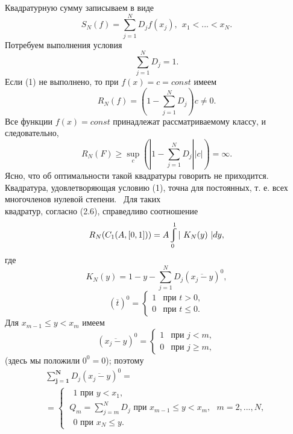 \documentclass[a5paper,12pt]{book}
\begin{document}
	Квадратурную сумму записываем в виде
	\vspace{-2mm}
	\footnotesize $$S_N(f)=\sum\limits_{j=1}^{N} D_jf(x_j),\ \ x_1<...<x_N.$$ \normalsize
	\vskip -2mm
	\noindent Потребуем выполнения условия
	\vspace{-2mm}
	\footnotesize
	\begin{equation}
		\sum_{j=1}^{N}D_j=1.
	\end{equation}
	\normalsize
	\vskip -3mm
	\noindent Если (1) не выполнено, то при $f(x)=c=const$ имеем
	\vspace{0mm}
	\footnotesize $$R_N(f)=\left(1-\sum\limits_{j=1}^{N}D_j\right)c\neq 0.$$ \normalsize
	\vskip 0mm
	\noindent Все функции $f(x)=const$ принадлежат рассматриваемому классу, и следовательно,
	\vspace{-2mm}
	\footnotesize $$R_N(F)\geqslant\sup_c\left(\left|1-\sum\limits_{j=1}^{N}D_j\right|\left|c\right|\right)=\infty.$$ \normalsize
	Ясно, что об оптимальности такой квадратуры говорить не при\-ходится.
	Квадратура, удовлетворяющая условию (1), точна для постоянных, т. е. всех
	многочленов нулевой степени. \ Для таких \\ квадратур, согласно (2.6), справедливо соотношение
	\footnotesize$$R_N(C_1(A,[0,1]))=A\varint\limits_{0}^{1}|\ K_N(y)\ |dy,$$ \normalsize
	\newpage
	\noindent где
	\footnotesize$$K_N(y)=1-y-\sum_{j=1}^{N}D_j(\overline{x_j-y})^0,$$\normalsize
	\footnotesize
	\begin{equation*}
		(\overline{t})^0 = 
		 \begin{cases}
		   1 &\text{при $t > 0,$}\\
		   0 &\text{при $t \leqslant 0.$}
		 \end{cases}
	\end{equation*}
	\normalsize
	\noindent Для $x_{m-1} \leqslant y < x_m$ имеем
	\footnotesize
	\begin{equation*}
		(\overline{x_j-y})^0 =
		 \begin{cases}
		   1 &\text{при $j < m,$}\\
		   0 &\text{при $j \geqslant m,$}
		 \end{cases}
	\end{equation*}
	\normalsize
	\noindent (здесь мы положили $0^0=0$); поэтому
	\footnotesize
	\begin{multline}
		\boldsymbol{\sum_{j=1}^{N}}D_j(\overline{x_j-y})^0=\\
		=
		\begin{cases}
			\text{\ \ \ \ \ \ }1 \text{\ \ \ \ \ \ \ \ \ \ 
			\ \ \ \ \ \ при\ \ \ \ \ \ \ \ } y<x_1,\\
			\ Q_m=\sum\limits_{j=m}^{N}D_j \text{\ \ \ \ при\ \ \ \ }
			x_{m-1}\leqslant y <x_m,\ \ \ m=2,...,N, \\
			\text{\ \ \ \ \ \ \ }0 \text{\ \ \ \ \ \ \ \ 
			\ \ \ \ \ \ \ при\ \ \ \ \ \ \ }x_N \leqslant y.
		\end{cases}
	\end{multline}
	\normalsize
\end{document}
